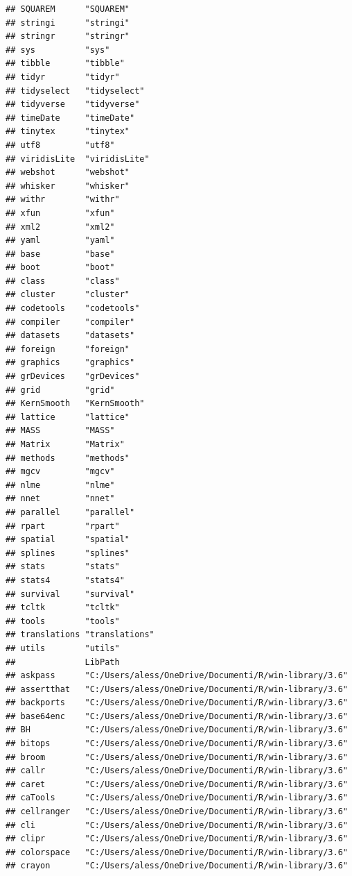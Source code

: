 \documentclass[]{article}
\begin{document}
\begin{verbatim}
## SQUAREM      "SQUAREM"     
## stringi      "stringi"     
## stringr      "stringr"     
## sys          "sys"         
## tibble       "tibble"      
## tidyr        "tidyr"       
## tidyselect   "tidyselect"  
## tidyverse    "tidyverse"   
## timeDate     "timeDate"    
## tinytex      "tinytex"     
## utf8         "utf8"        
## viridisLite  "viridisLite" 
## webshot      "webshot"     
## whisker      "whisker"     
## withr        "withr"       
## xfun         "xfun"        
## xml2         "xml2"        
## yaml         "yaml"        
## base         "base"        
## boot         "boot"        
## class        "class"       
## cluster      "cluster"     
## codetools    "codetools"   
## compiler     "compiler"    
## datasets     "datasets"    
## foreign      "foreign"     
## graphics     "graphics"    
## grDevices    "grDevices"   
## grid         "grid"        
## KernSmooth   "KernSmooth"  
## lattice      "lattice"     
## MASS         "MASS"        
## Matrix       "Matrix"      
## methods      "methods"     
## mgcv         "mgcv"        
## nlme         "nlme"        
## nnet         "nnet"        
## parallel     "parallel"    
## rpart        "rpart"       
## spatial      "spatial"     
## splines      "splines"     
## stats        "stats"       
## stats4       "stats4"      
## survival     "survival"    
## tcltk        "tcltk"       
## tools        "tools"       
## translations "translations"
## utils        "utils"       
##              LibPath                                              
## askpass      "C:/Users/aless/OneDrive/Documenti/R/win-library/3.6"
## assertthat   "C:/Users/aless/OneDrive/Documenti/R/win-library/3.6"
## backports    "C:/Users/aless/OneDrive/Documenti/R/win-library/3.6"
## base64enc    "C:/Users/aless/OneDrive/Documenti/R/win-library/3.6"
## BH           "C:/Users/aless/OneDrive/Documenti/R/win-library/3.6"
## bitops       "C:/Users/aless/OneDrive/Documenti/R/win-library/3.6"
## broom        "C:/Users/aless/OneDrive/Documenti/R/win-library/3.6"
## callr        "C:/Users/aless/OneDrive/Documenti/R/win-library/3.6"
## caret        "C:/Users/aless/OneDrive/Documenti/R/win-library/3.6"
## caTools      "C:/Users/aless/OneDrive/Documenti/R/win-library/3.6"
## cellranger   "C:/Users/aless/OneDrive/Documenti/R/win-library/3.6"
## cli          "C:/Users/aless/OneDrive/Documenti/R/win-library/3.6"
## clipr        "C:/Users/aless/OneDrive/Documenti/R/win-library/3.6"
## colorspace   "C:/Users/aless/OneDrive/Documenti/R/win-library/3.6"
## crayon       "C:/Users/aless/OneDrive/Documenti/R/win-library/3.6"

\end{verbatim}
\end{document}
